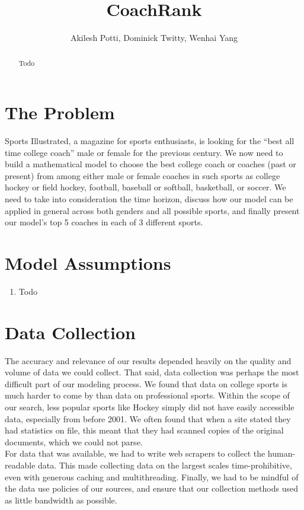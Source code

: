 \documentclass[titlepage]{article}
\begin{document}
\title{CoachRank}
\author{Akilesh Potti, Dominick Twitty, Wenhai Yang}
\maketitle

\begin{abstract}
Todo
\end{abstract}


\section{The Problem}
Sports Illustrated, a magazine for sports enthusiasts, is looking for the “best all time college coach” male or female for the previous century. We now need to build a mathematical model to choose the best college coach or coaches (past or present) from among either male or female coaches in such sports as college hockey or field hockey, football, baseball or softball, basketball, or soccer. We need to take into consideration the time horizon, discuss how our model can be applied in general across both genders and all possible sports, and finally present our model’s top 5 coaches in each of 3 different sports.

\section{Model Assumptions}
\begin{enumerate}
\item Todo
\end{enumerate}


\section{Data Collection}
The accuracy and relevance of our results depended heavily on the quality and volume of data we could collect. That said, data collection was perhaps the most difficult part of our modeling process. We found that data on college sports is much harder to come by than data on professional sports. Within the scope of our search, less popular sports like Hockey simply did not have easily accessible data, especially from before 2001. We often found that when a site stated they had statistics on file, this meant that they had scanned copies of the original documents, which we could not parse.
\\

\noindent For data that was available, we had to write web scrapers to collect the human-readable data. This made collecting data on the largest scales time-prohibitive, even with generous caching and multithreading. Finally, we had to be mindful of the data use policies of our sources, and ensure that our collection methods used as little bandwidth as possible.
\\
\end{document}
